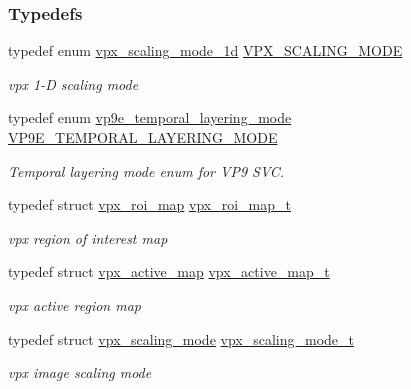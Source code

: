 \subsubsection*{Typedefs}
\begin{DoxyCompactItemize}
\item 
typedef enum \hyperlink{group__vp8__encoder_ga70071b1bb6cac9a1ef0ea3d8362ff94f}{vpx\+\_\+scaling\+\_\+mode\+\_\+1d} \hyperlink{group__vp8__encoder_ga100ca891ad96995e61780ae777bf8663}{V\+P\+X\+\_\+\+S\+C\+A\+L\+I\+N\+G\+\_\+\+M\+O\+DE}
\begin{DoxyCompactList}\small\item\em vpx 1-\/D scaling mode \end{DoxyCompactList}\item 
typedef enum \hyperlink{group__vp8__encoder_gabe875c0c3993e488ffb342cf548a8ce8}{vp9e\+\_\+temporal\+\_\+layering\+\_\+mode} \hyperlink{group__vp8__encoder_ga62d21ce19d4042700c89f1b80f3c554b}{V\+P9\+E\+\_\+\+T\+E\+M\+P\+O\+R\+A\+L\+\_\+\+L\+A\+Y\+E\+R\+I\+N\+G\+\_\+\+M\+O\+DE}
\begin{DoxyCompactList}\small\item\em Temporal layering mode enum for V\+P9 S\+VC. \end{DoxyCompactList}\item 
typedef struct \hyperlink{structvpx__roi__map}{vpx\+\_\+roi\+\_\+map} \hyperlink{group__vp8__encoder_ga5be1a94d436a5e9296f5be06f57ccbd1}{vpx\+\_\+roi\+\_\+map\+\_\+t}
\begin{DoxyCompactList}\small\item\em vpx region of interest map \end{DoxyCompactList}\item 
typedef struct \hyperlink{structvpx__active__map}{vpx\+\_\+active\+\_\+map} \hyperlink{group__vp8__encoder_ga7b48f7962f5061979f0f8ece6fb1cba8}{vpx\+\_\+active\+\_\+map\+\_\+t}
\begin{DoxyCompactList}\small\item\em vpx active region map \end{DoxyCompactList}\item 
typedef struct \hyperlink{structvpx__scaling__mode}{vpx\+\_\+scaling\+\_\+mode} \hyperlink{group__vp8__encoder_ga9600359ed9096cd96c621d9cf6c8df38}{vpx\+\_\+scaling\+\_\+mode\+\_\+t}
\begin{DoxyCompactList}\small\item\em vpx image scaling mode \end{DoxyCompactList}\item 

\end{DoxyCompactItemize}
